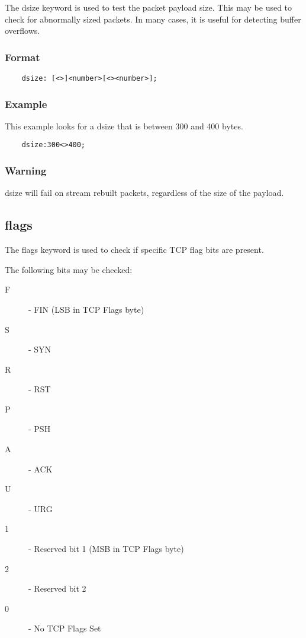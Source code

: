 \documentclass[english]{report}
\begin{document}
The dsize keyword is used to test the packet payload size.  This may be used to
check for abnormally sized packets.  In many cases, it is useful for detecting
buffer overflows.

\subsubsection{Format}

\begin{verbatim}
    dsize: [<>]<number>[<><number>];
\end{verbatim}

\subsubsection{Example}

This example looks for a dsize that is between 300 and 400 bytes.

\begin{verbatim}
    dsize:300<>400;
\end{verbatim}

\subsubsection{Warning}

dsize will fail on stream rebuilt packets, regardless of the size of the
payload.

\subsection{flags}

The flags keyword is used to check if specific TCP flag bits are present.

The following bits may be checked:

\begin{description}
\item [F] - FIN (LSB in TCP Flags byte)
\item [S] - SYN 
\item [R] - RST 
\item [P] - PSH 
\item [A] - ACK 
\item [U] - URG 
\item [1] - Reserved bit 1 (MSB in TCP Flags byte)
\item [2] - Reserved bit 2 
\item [0] - No TCP Flags Set
\end{description}
\end{document}

